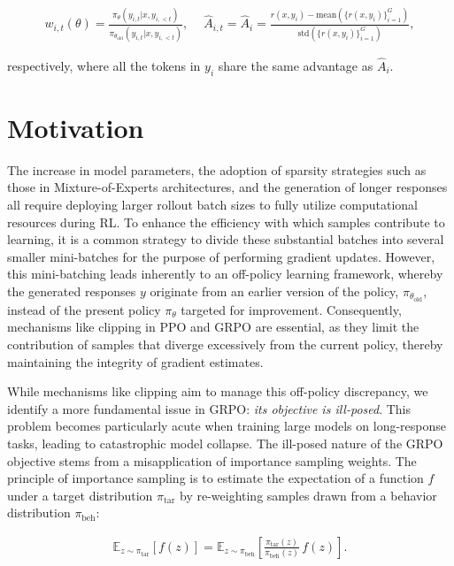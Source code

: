 \begin{align}
    w_{i,t}(\theta)=\frac{ \pi_{\theta} (y_{i,t} | x, y_{i,<t}) }{ \pi_{\theta_\text{old}} (y_{i,t} | x,y_{i,<t})},\quad\ 
    \widehat{A}_{i,t} = \widehat{A}_{i} = \frac{r(x, y_i) - \mathrm{mean} \left( \{ r(x, y_i) \}_{i=1}^G \right) }{ \mathrm{std} \left( \{ r(x, y_i) \}_{i=1}^G \right) },
\end{align}

respectively, where all the tokens in $y_i$ share the same advantage as $\widehat{A}_{i}$.

\section{Motivation}
\label{sec:motivation}

The increase in model parameters, the adoption of sparsity strategies such as those in Mixture-of-Experts architectures, and the generation of longer responses all require deploying larger rollout batch sizes to fully utilize computational resources during RL. To enhance the efficiency with which samples contribute to learning, it is a common strategy to divide these substantial batches into several smaller mini-batches for the purpose of performing gradient updates. However, this mini-batching leads inherently to an off-policy learning framework, whereby the generated responses $y$ originate from an earlier version of the policy, $\pi_{\theta_\text{old}}$, instead of the present policy $\pi_\theta$ targeted for improvement. Consequently, mechanisms like clipping in PPO and GRPO are essential, as they limit the contribution of samples that diverge excessively from the current policy, thereby maintaining the integrity of gradient estimates.

While mechanisms like clipping aim to manage this off-policy discrepancy, we identify a more fundamental issue in GRPO: \textit{its objective is ill-posed}. This problem becomes particularly acute when training large models on long-response tasks, leading to catastrophic model collapse. The ill-posed nature of the GRPO objective stems from a misapplication of importance sampling weights. The principle of importance sampling is to estimate the expectation of a function $f$ under a target distribution $\pi_\text{tar}$ by re-weighting samples drawn from a behavior distribution $\pi_\text{beh}$:

\begin{align}
\mathbb{E}_{z \sim \pi_\text{tar}} \left[ f(z) \right] = \mathbb{E}_{z \sim \pi_\text{beh}} \left[ \frac{ \pi_\text{tar} (z) }{ \pi_\text{beh} (z)} \, f(z) \right].
\end{align}


